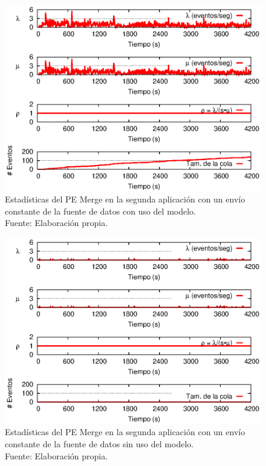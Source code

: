 \begin{figure}[!ht]
    \centering
    \captionsetup{justification=centering}
    \includegraphics[scale=1]{images/exp/app2/uniform/cm/statusMergePE.eps}
    \caption[Estad\'isticas del PE Merge en la segunda aplicaci\'on con un env\'io constante de la fuente de datos con uso del modelo.]{Estad\'isticas del PE Merge en la segunda aplicaci\'on con un env\'io constante de la fuente de datos con uso del modelo.\\Fuente: Elaboraci\'on propia.}
    \label{fig:app2-uniform-statusMergePE-cm}
\end{figure}

\begin{figure}[!ht]
    \centering
    \captionsetup{justification=centering}
    \includegraphics[scale=1]{images/exp/app2/uniform/sm/statusMergePE.eps}
    \caption[Estad\'isticas del PE Merge en la segunda aplicaci\'on con un env\'io constante de la fuente de datos sin uso del modelo.]{Estad\'isticas del PE Merge en la segunda aplicaci\'on con un env\'io constante de la fuente de datos sin uso del modelo.\\Fuente: Elaboraci\'on propia.}
    \label{fig:app2-uniform-statusMergePE-sm}
\end{figure}

